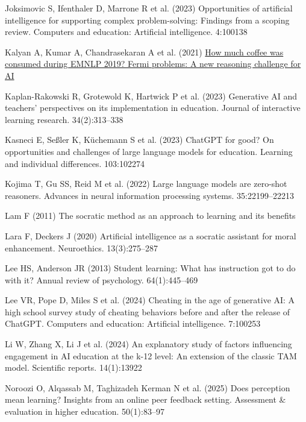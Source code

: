 \documentclass[
  11pt,
]{article}
\newlength{\cslhangindent}
\newenvironment{CSLReferences}[2] %
 {\begin{list}{}{%
  \setlength{\itemindent}{0pt}
  \setlength{\leftmargin}{0pt}
  \setlength{\parsep}{0pt}
  \ifodd #1
   \setlength{\leftmargin}{\cslhangindent}
   \setlength{\itemindent}{-1\cslhangindent}
  \fi
  \setlength{\itemsep}{#2\baselineskip}}}
 {\end{list}}
\begin{document}
\begin{CSLReferences}{1}{0}
Joksimovic S, Ifenthaler D, Marrone R et al. (2023) Opportunities of artificial intelligence for supporting complex problem-solving: Findings from a scoping review. Computers and education: Artificial intelligence. 4:100138

Kalyan A, Kumar A, Chandrasekaran A et al. (2021) \href{https://arxiv.org/pdf/2110.14207.pdf}{How much coffee was consumed during EMNLP 2019? Fermi problems: A new reasoning challenge for AI}

Kaplan-Rakowski R, Grotewold K, Hartwick P et al. (2023) Generative AI and teachers' perspectives on its implementation in education. Journal of interactive learning research. 34(2):313--338

Kasneci E, Seßler K, Küchemann S et al. (2023) ChatGPT for good? On opportunities and challenges of large language models for education. Learning and individual differences. 103:102274

Kojima T, Gu SS, Reid M et al. (2022) Large language models are zero-shot reasoners. Advances in neural information processing systems. 35:22199--22213

Lam F (2011) The socratic method as an approach to learning and its benefits

Lara F, Deckers J (2020) Artificial intelligence as a socratic assistant for moral enhancement. Neuroethics. 13(3):275--287

Lee HS, Anderson JR (2013) Student learning: What has instruction got to do with it? Annual review of psychology. 64(1):445--469

Lee VR, Pope D, Miles S et al. (2024) Cheating in the age of generative AI: A high school survey study of cheating behaviors before and after the release of ChatGPT. Computers and education: Artificial intelligence. 7:100253

Li W, Zhang X, Li J et al. (2024) An explanatory study of factors influencing engagement in AI education at the k-12 level: An extension of the classic TAM model. Scientific reports. 14(1):13922

Noroozi O, Alqassab M, Taghizadeh Kerman N et al. (2025) Does perception mean learning? Insights from an online peer feedback setting. Assessment \& evaluation in higher education. 50(1):83--97


\end{CSLReferences}
\end{document}
